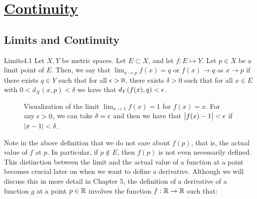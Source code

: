 \newpage 
\section[Continuity]{\hyperlink{toc}{Continuity}}

\subsection{Limits and Continuity}
\begin{definition}{Limits}{4.1}
    Let $X, Y$ be metric spaces. Let $E \subset X$, and let $f: E \mapsto Y$. Let $p \in X$ be a limit point of $E$. Then, we say that $\lim_{x\rightarrow p} f(x) = q$ or $f(x) \rightarrow q$ as $x \rightarrow p$ if there exists $q \in Y$ such that for all $\epsilon > 0$, there exists $\delta > 0$ such that for all $x \in E$ with $0 < d_X(x, p) < \delta$ we have that $d_Y(f(x), q) < \epsilon$. 
\end{definition}
\begin{figure}[htbp]
    \centering
    \caption{Visualization of the limit $\lim_{x \rightarrow 1}f(x) = 1$ for $f(x) = x$. For any $\epsilon > 0$, we can take $\delta = \epsilon$ and then we have that $\abs{f(x) - 1} < \epsilon$ if $\abs{x - 1} < \delta$.}
    \label{fig17}
\end{figure}
Note in the above definition that we do not care about $f(p)$, that is, the actual value of $f$ at $p$. In particular, if $p \notin E$, then $f(p)$ is not even necessarily defined. This distinction between the limit and the actual value of a function at a point becomes crucial later on when we want to define a derivative. Although we will discuss this in more detail in Chapter 5, the definition of a derivative of a function $g$ at a point $p \in \mathbb{R}$ involves the function $f: \mathbb{R} \rightarrow \mathbb{R}$ such that:
